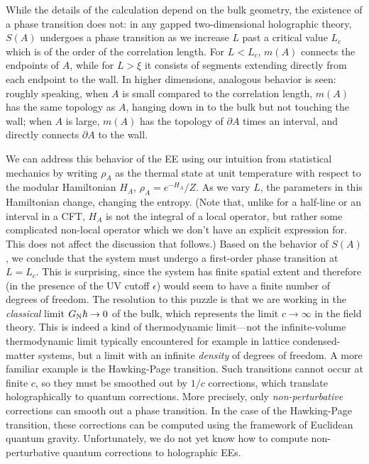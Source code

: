 \documentclass[11pt]{article}
\newcommand{\GN}{G_{\rm N}}
\begin{document}
While the details of the calculation depend on the bulk geometry, the existence of a phase transition does not: in any gapped two-dimensional holographic theory, $S(A)$ undergoes a phase transition as we increase $L$ past a critical value $L_c$ which is of the order of the correlation length. For $L<L_c$, $m(A)$ connects the endpoints of $A$, while for $L>\xi$ it consists of segments extending directly from each endpoint to the wall. In higher dimensions, analogous behavior is seen: roughly speaking, when $A$ is small compared to the correlation length, $m(A)$ has the same topology as $A$, hanging down in to the bulk but not touching the wall; when $A$ is large, $m(A)$ has the topology of $\partial A$ times an interval, and directly connects $\partial A$ to the wall.

We can address this behavior of the EE using our intuition from statistical mechanics by writing $\rho_A$ as the thermal state at unit temperature with respect to the modular Hamiltonian $H_A$, $\rho_A=e^{-H_A}/Z$. As we vary $L$, the parameters in this Hamiltonian change, changing the entropy. (Note that, unlike for a half-line or an interval in a CFT, $H_A$ is not the integral of a local operator, but rather some complicated non-local operator which we don't have an explicit expression for. This does not affect the discussion that follows.) Based on the behavior of $S(A)$, we conclude that the system must undergo a first-order phase transition at $L=L_c$. This is surprising, since the system has finite spatial extent and therefore (in the presence of the UV cutoff $\epsilon$) would seem to have a finite number of degrees of freedom. The resolution to this puzzle is that we are working in the \emph{classical} limit $\GN\hbar\to0$ of the bulk, which represents the limit $c\to\infty$ in the field theory. This is indeed a kind of thermodynamic limit---not the infinite-volume thermodynamic limit typically encountered for example in lattice condensed-matter systems, but a limit with an infinite \emph{density} of degrees of freedom. A more familiar example is the Hawking-Page transition. Such transitions cannot occur at finite $c$, so they must be smoothed out by $1/c$ corrections, which translate holographically to quantum corrections. More precisely, only \emph{non-perturbative} corrections can smooth out a phase transition. In the case of the Hawking-Page transition, these corrections can be computed using the framework of Euclidean quantum gravity. Unfortunately, we do not yet know how to compute non-perturbative quantum corrections to holographic EEs.
\end{document}
